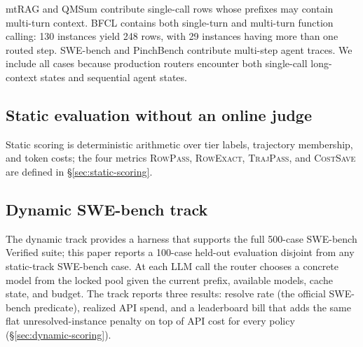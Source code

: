 mtRAG and QMSum contribute single-call rows whose prefixes may contain
multi-turn context. BFCL contains both single-turn and multi-turn function
calling: 130 instances yield 248 rows, with 29 instances having more than one
routed step. SWE-bench and PinchBench contribute multi-step agent traces. We
include all cases because production routers encounter both single-call
long-context states and sequential agent states.

\subsection{Static evaluation without an online judge}

Static scoring is deterministic arithmetic over tier labels, trajectory
membership, and token costs; the four metrics \textsc{RowPass},
\textsc{RowExact}, \textsc{TrajPass}, and \textsc{CostSave} are defined in
\S\ref{sec:static-scoring}.

\subsection{Dynamic SWE-bench track}

The dynamic track provides a harness that supports the full 500-case
SWE-bench Verified suite; this paper reports a 100-case held-out evaluation
disjoint from any static-track SWE-bench case. At each LLM call the router
chooses a concrete model from the locked pool given the current prefix,
available models, cache state, and budget. The track reports three results:
resolve rate (the official SWE-bench predicate), realized API spend, and a
leaderboard bill that adds the same flat unresolved-instance penalty on top
of API cost for every policy (\S\ref{sec:dynamic-scoring}).
